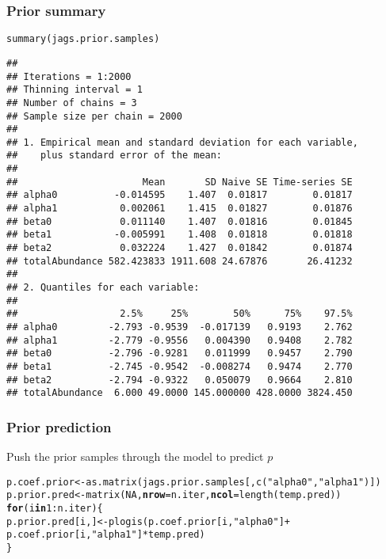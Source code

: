 \documentclass[color=usenames,dvipsnames]{beamer}\usepackage[]{graphicx}\usepackage[]{color}
\makeatletter
\newcommand{\hlnum}[1]{\textcolor[rgb]{0.69,0.494,0}{#1}}%
\newcommand{\hlstr}[1]{\textcolor[rgb]{0.749,0.012,0.012}{#1}}%
\newcommand{\hlopt}[1]{\textcolor[rgb]{0,0,0}{#1}}%
\newcommand{\hlstd}[1]{\textcolor[rgb]{0,0,0}{#1}}%
\newcommand{\hlkwa}[1]{\textcolor[rgb]{0,0,0}{\textbf{#1}}}%
\newcommand{\hlkwb}[1]{\textcolor[rgb]{0,0.341,0.682}{#1}}%
\newcommand{\hlkwc}[1]{\textcolor[rgb]{0,0,0}{\textbf{#1}}}%
\newcommand{\hlkwd}[1]{\textcolor[rgb]{0.004,0.004,0.506}{#1}}%
\newenvironment{kframe}{%
 \def\at@end@of@kframe{}%
 \ifinner\ifhmode%
  \def\at@end@of@kframe{\end{minipage}}%
  \begin{minipage}{\columnwidth}%
 \fi\fi%
 \def\FrameCommand##1{\hskip\@totalleftmargin \hskip-\fboxsep
 \colorbox{shadecolor}{##1}\hskip-\fboxsep
     \hskip-\linewidth \hskip-\@totalleftmargin \hskip\columnwidth}%
 \MakeFramed {\advance\hsize-\width
   \@totalleftmargin\z@ \linewidth\hsize
   \@setminipage}}%
 {\par\unskip\endMakeFramed%
 \at@end@of@kframe}
\newenvironment{knitrout}{}{} %
\makeatother
\begin{document}
\begin{frame}[fragile]
  \frametitle{Prior summary}
\begin{knitrout}\tiny
{}\color{fgcolor}\begin{kframe}
\begin{alltt}
\hlkwd{summary}\hlstd{(jags.prior.samples)}
\end{alltt}
\begin{verbatim}
## 
## Iterations = 1:2000
## Thinning interval = 1 
## Number of chains = 3 
## Sample size per chain = 2000 
## 
## 1. Empirical mean and standard deviation for each variable,
##    plus standard error of the mean:
## 
##                      Mean       SD Naive SE Time-series SE
## alpha0          -0.014595    1.407  0.01817        0.01817
## alpha1           0.002061    1.415  0.01827        0.01876
## beta0            0.011140    1.407  0.01816        0.01845
## beta1           -0.005991    1.408  0.01818        0.01818
## beta2            0.032224    1.427  0.01842        0.01874
## totalAbundance 582.423833 1911.608 24.67876       26.41232
## 
## 2. Quantiles for each variable:
## 
##                  2.5%     25%        50%      75%    97.5%
## alpha0         -2.793 -0.9539  -0.017139   0.9193    2.762
## alpha1         -2.779 -0.9556   0.004390   0.9408    2.782
## beta0          -2.796 -0.9281   0.011999   0.9457    2.790
## beta1          -2.745 -0.9542  -0.008274   0.9474    2.770
## beta2          -2.794 -0.9322   0.050079   0.9664    2.810
## totalAbundance  6.000 49.0000 145.000000 428.0000 3824.450
\end{verbatim}
\end{kframe}
\end{knitrout}
\end{frame}






\begin{frame}[fragile]
  \frametitle{Prior prediction}
  \small
  Push the prior samples through the model to predict $p$
\begin{knitrout}\scriptsize
{}\color{fgcolor}\begin{kframe}
\begin{alltt}
\hlstd{p.coef.prior} \hlkwb{<-} \hlkwd{as.matrix}\hlstd{(jags.prior.samples[,}\hlkwd{c}\hlstd{(}\hlstr{"alpha0"}\hlstd{,}\hlstr{"alpha1"}\hlstd{)])}
\hlstd{p.prior.pred} \hlkwb{<-} \hlkwd{matrix}\hlstd{(}\hlnum{NA}\hlstd{,} \hlkwc{nrow}\hlstd{=n.iter,} \hlkwc{ncol}\hlstd{=}\hlkwd{length}\hlstd{(temp.pred))}
\hlkwa{for}\hlstd{(i} \hlkwa{in} \hlnum{1}\hlopt{:}\hlstd{n.iter) \{}
    \hlstd{p.prior.pred[i,]} \hlkwb{<-} \hlkwd{plogis}\hlstd{(p.coef.prior[i,}\hlstr{"alpha0"}\hlstd{]} \hlopt{+}
                               \hlstd{p.coef.prior[i,}\hlstr{"alpha1"}\hlstd{]}\hlopt{*}\hlstd{temp.pred)}
\hlstd{\}}
\end{alltt}
\end{kframe}
\end{knitrout}
\end{frame}
\end{document}
